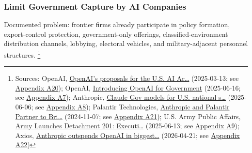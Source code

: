 \documentclass[
  american,
  11pt,
  letterpaper,
]{article}
\begin{document}
\subsubsection{Limit Government Capture by AI
Companies}\label{limit-government-capture-by-ai-companies}

Documented problem: frontier firms already participate in policy
formation, export-control protection, government-only offerings,
classified-environment distribution channels, lobbying, electoral
vehicles, and military-adjacent personnel structures. \footnote{Sources:
  OpenAI,
  \href{https://openai.com/global-affairs/openai-proposals-for-the-us-ai-action-plan/}{OpenAI's
  proposals for the U.S. AI Ac\ldots{}} (2025-03-13; see
  \hyperref[ch-10-appendix-a20-openais-proposals-for-the-us-ai-action-plan]{Appendix
  A20}); OpenAI,
  \href{https://openai.com/global-affairs/introducing-openai-for-government/}{Introducing
  OpenAI for Government} (2025-06-16; see
  \hyperref[ch-10-appendix-a7-introducing-openai-for-government]{Appendix
  A7}); Anthropic,
  \href{https://www.anthropic.com/news/claude-gov-models-for-u-s-national-security-customers}{Claude
  Gov models for U.S. national s\ldots{}} (2025-06-06; see
  \hyperref[ch-10-appendix-a8-claude-gov-models-for-u-s-national-security-customers]{Appendix
  A8}); Palantir Technologies,
  \href{https://investors.palantir.com/news-details/2024/Anthropic-and-Palantir-Partner-to-Bring-Claude-AI-Models-to-AWS-for-U.S.-Government-Intelligence-and-Defense-Operations/}{Anthropic
  and Palantir Partner to Bri\ldots{}} (2024-11-07; see
  \hyperref[ch-10-appendix-a21-anthropic-and-palantir-partner-to-bring-claude-ai-models-to-aws-for-u-s-government-intelligence-and-defense-operations]{Appendix
  A21}); U.S. Army Public Affairs,
  \href{https://www.army.mil/article/286317/army_launches_detachment_201_executive_innovation_corps_to_drive_tech_transformation}{Army
  Launches Detachment 201: Executi\ldots{}} (2025-06-13; see
  \hyperref[ch-10-appendix-a9-army-launches-detachment-201-executive-innovation-corps-to-drive-tech-transformation]{Appendix
  A9}); Axios,
  \href{https://www.axios.com/2026/04/21/anthropic-outspends-openai-biggest-lobbying-quarter}{Anthropic
  outspends OpenAI in biggest\ldots{}} (2026-04-21; see
  \hyperref[ch-10-appendix-a22-anthropic-outspends-openai-in-biggest-ever-lobbying-quarter]{Appendix
  A22})}
\end{document}
